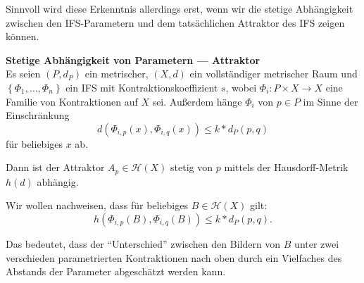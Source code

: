 \documentclass[afourpaper]{latex-classes/handout}
\begin{document}
Sinnvoll wird diese Erkenntnis allerdings erst, wenn wir die stetige Abhängigkeit zwischen den IFS-Parametern und dem tatsächlichen Attraktor des IFS zeigen können.

\begin{theorembox}
  \textbf{Stetige Abhängigkeit von Parametern --- Attraktor} \\
  \vspace{1mm}
  Es seien \( (P, d_P) \) ein metrischer, \( (X,d) \) ein vollständiger metrischer Raum und \( \left \{ \Phi_1, \dots, \Phi_n \right \} \) ein IFS mit Kontraktionskoeffizient \( s \), wobei \( \Phi_i : P \times X \to X \) eine Familie von Kontraktionen auf \( X \) sei. Außerdem hänge \( \Phi_i \) von \( p \in P \) im Sinne der Einschränkung
  \begin{equation*}
    d(\Phi_{i,p}(x), \Phi_{i,q}(x)) \leq k * d_P(p,q)
  \end{equation*}
  für beliebiges \( x \) ab.

  \vspace{1em}
  Dann ist der Attraktor \( A_p \in \mathcal{H}(X) \) stetig von \( p \) mittels der Hausdorff-Metrik \( h(d) \) abhängig.
\end{theorembox}

Wir wollen nachweisen, dass für beliebiges \( B \in \mathcal{H}(X) \) gilt:
\begin{equation*}
  h(\Phi_{i,p}(B), \Phi_{i,q}(B)) \leq k * d_P(p,q)\text{.}
\end{equation*}

Das bedeutet, dass der ``Unterschied'' zwischen den Bildern von \( B \) unter zwei verschieden parametrierten Kontraktionen nach oben durch ein Vielfaches des Abstands der Parameter abgeschätzt werden kann.
\end{document}
